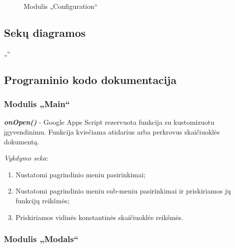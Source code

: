 \begin{figure}[H]
    \caption{Modulis „Configuration“}
    \label{img:model}
\end{figure}

\subsection{Sekų diagramos}
„“







\subsection{Programinio kodo dokumentacija}



\subsubsection{Modulis „Main“}

\textit{\textbf{onOpen()}} - Google Apps Script rezervuota funkcija su kustomizuotu įgyvendinimu. Funkcija kviečiama atidarius arba perkrovus skaičiuoklės dokumentą. 

\bigskip
\textit{Vykdymo seka}:
\begin{enumerate}
    \itemsep0em 
    \item Nustatomi pagrindinio meniu pasirinkimai;
    \item Nustatomi pagrindinio meniu sub-meniu pasirinkimai ir priskiriamos jų funkcijų reikšmės;
    \item Priskiriamos vidinės konstantinės skaičiuoklės reikšmės.
\end{enumerate}



\subsubsection{Modulis „Modals“}

